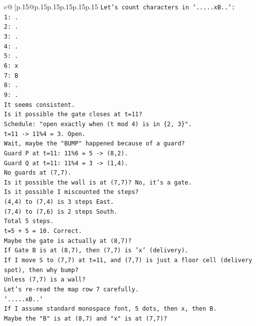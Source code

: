 \documentclass{article}
\begin{document}
{\begin{supertabular}{c@{$\;$}|p{.15\linewidth}@{}p{.15\linewidth}p{.15\linewidth}p{.15\linewidth}p{.15\linewidth}p{.15\linewidth}}
{{{\texttt{Let's count characters in `.....xB..`:} \\
\texttt{1: .} \\
\texttt{2: .} \\
\texttt{3: .} \\
\texttt{4: .} \\
\texttt{5: .} \\
\texttt{6: x} \\
\texttt{7: B} \\
\texttt{8: .} \\
\texttt{9: .} \\
\texttt{It seems consistent.} \\
\texttt{Is it possible the gate closes at t=11?} \\
\texttt{Schedule: "open exactly when (t mod 4) is in \{2, 3\}".} \\
\texttt{t=11 {-}> 11\%4 = 3. Open.} \\
\texttt{Wait, maybe the "BUMP" happened because of a guard?} \\
\texttt{Guard P at t=11: 11\%6 = 5 {-}> (8,2).} \\
\texttt{Guard Q at t=11: 11\%4 = 3 {-}> (1,4).} \\
\texttt{No guards at (7,7).} \\
\texttt{Is it possible the wall is at (7,7)? No, it's a gate.} \\
\texttt{Is it possible I miscounted the steps?} \\
\texttt{(4,4) to (7,4) is 3 steps East.} \\
\texttt{(7,4) to (7,6) is 2 steps South.} \\
\texttt{Total 5 steps.} \\
\texttt{t=5 + 5 = 10. Correct.} \\
\texttt{Maybe the gate is actually at (8,7)?} \\
\texttt{If Gate B is at (8,7), then (7,7) is 'x' (delivery).} \\
\texttt{If I move S to (7,7) at t=11, and (7,7) is just a floor cell (delivery spot), then why bump?} \\
\texttt{Unless (7,7) is a wall?} \\
\texttt{Let's re{-}read the map row 7 carefully.} \\
\texttt{`.....xB..`} \\
\texttt{If I assume standard monospace font, 5 dots, then x, then B.} \\
\texttt{Maybe the "B" is at (8,7) and "x" is at (7,7)?} \\
}}}
\end{supertabular}}
\end{document}
